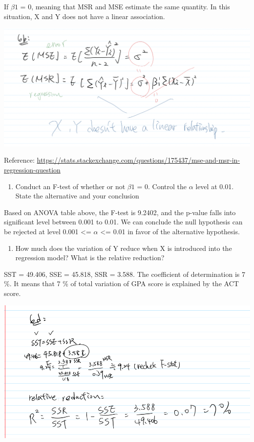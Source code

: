 \documentclass[
]{article}
\providecommand{\tightlist}{%
  \setlength{\itemsep}{0pt}\setlength{\parskip}{0pt}}
\begin{document}
If \(\beta1\) = 0, meaning that MSR and MSE estimate the same quantity.
In this situation, X and Y does not have a linear association.

\includegraphics{pics/Screen Shot 2021-02-21 at 3.36.08 PM.png}

Reference:
\url{https://stats.stackexchange.com/questions/175437/mse-and-msr-in-regression-question}

\begin{enumerate}
\def\labelenumi{(\alph{enumi})}
\setcounter{enumi}{2}
\tightlist
\item
  Conduct an F-test of whether or not \(\beta1\) = 0. Control the
  \(\alpha\) level at 0.01. State the alternative and your conclusion
\end{enumerate}

Based on ANOVA table above, the F-test is 9.2402, and the p-value falls
into significant level between 0.001 to 0.01. We can conclude the null
hypothesis can be rejected at level 0.001 \textless= \(\alpha\)
\textless= 0.01 in favor of the alternative hypothesis.

\begin{enumerate}
\def\labelenumi{(\alph{enumi})}
\setcounter{enumi}{3}
\tightlist
\item
  How much does the variation of Y reduce when X is introduced into the
  regression model? What is the relative reduction?
\end{enumerate}

SST = 49.406, SSE = 45.818, SSR = 3.588. The coefficient of
determination is 7 \%. It means that 7 \% of total variation of GPA
score is explained by the ACT score.

\includegraphics{pics/Screen Shot 2021-02-19 at 1.51.21 PM.png}
\end{document}
